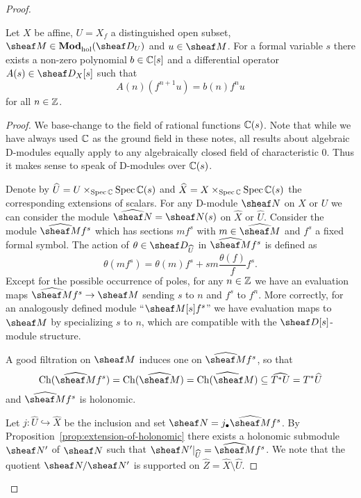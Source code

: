 \documentclass[number-in-sections,a4paper]{notes}
\begin{document}
\begin{proof}
    \begin{Lemma}\label{lem:b-functions}
        Let $X$ be affine, $U = X_f$ a distinguished open subset, $\sheaf M \in \catDModhol{U}$ and $u \in \sheaf M$.
        For a formal variable $s$ there exists a non-zero polynomial $b \in {\mathbb{C}}[s]$ and a differential operator $A(s) \in \sD_X[s]$ such that
        \[
            A(n)(f^{n+1}u) = b(n) f^{n}u
        \]
        for all $n \in {\mathbb{Z}}$.
    \end{Lemma}

    \begin{proof}
        We base-change to the field of rational functions ${\mathbb{C}}(s)$.
        Note that while we have always used ${\mathbb{C}}$ as the ground field in these notes, all results about algebraic D-modules equally apply to any algebraically closed field of characteristic $0$.
        Thus it makes sense to speak of D-modules over ${\mathbb{C}}(s)$.

        Denote by $\widehat U = U \times_{\operatorname{Spec} {\mathbb{C}}} \operatorname{Spec} {\mathbb{C}}(s)$ and $\widehat X = X \times_{\operatorname{Spec} {\mathbb{C}}} \operatorname{Spec} {\mathbb{C}}(s)$ the corresponding extensions of scalars.
        For any D-module $\sheaf N$ on $X$ or $U$ we can consider the module $\widehat{\sheaf N} = \sheaf N(s)$ on $\widehat X$ or $\widehat U$.
        Consider the module $\widehat{\sheaf M}f^s$ which has sections $mf^s$ with $m \in \widehat{\sheaf M}$ and $f^s$ a fixed formal symbol.
        The action of $\theta \in \sD_{\widehat U}$ in $\widehat{\sheaf M}f^s$ is defined as
        \[
            \theta(mf^s) = \theta(m)f^s + sm\frac{\theta(f)}{f}f^s.
        \]
        Except for the possible occurrence of poles, for any $n \in {\mathbb{Z}}$ we have an evaluation maps $\widehat{\sheaf M}f^s \to \sheaf M$ sending $s$ to $n$ and $f^s$ to $f^n$.
        More correctly, for an analogously defined module \enquote{$\sheaf M[s]f^s$} we have evaluation maps to $\sheaf M$ by specializing $s$ to $n$, which are compatible with the $\sD[s]$-module structure.

        A good filtration on $\sheaf M$ induces one on $\widehat{\sheaf M}f^s$, so that
        \[
            \Ch(\widehat{\sheaf M}f^s) =
            \Ch(\widehat{\sheaf M}) =
            \widehat{\Ch(\sheaf M)} \subseteq
            \widehat{T^*U} =
            T^*\widehat{U}
        \]
        and $\widehat{\sheaf M}f^s$ is holonomic.

        Let $j\colon \widehat U \hookrightarrow \widehat X$ be the inclusion and set $\sheaf N = j_\bullet \widehat{\sheaf M}f^s$.
        By Proposition~\ref{prop:extension-of-holonomic} there exists a holonomic submodule $\sheaf N'$ of $\sheaf N$ such that $\res{\sheaf N'}{\widehat U} = \widehat{\sheaf M}f^s$.
        We note that the quotient $\sheaf N/\sheaf N'$ is supported on $\widehat Z =  \widehat X \setminus \widehat U$.
        

\end{proof}
\end{proof}
\end{document}
